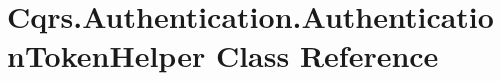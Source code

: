 \hypertarget{classCqrs_1_1Authentication_1_1AuthenticationTokenHelper}{}\section{Cqrs.\+Authentication.\+Authentication\+Token\+Helper Class Reference}
\label{classCqrs_1_1Authentication_1_1AuthenticationTokenHelper}
